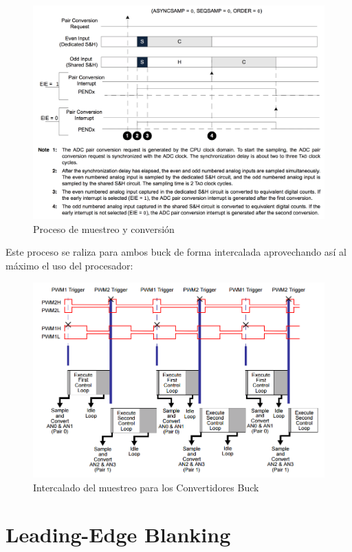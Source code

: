 \documentclass[12pt]{report}
\begin{document}
\begin{figure}[H]
	\centering
	\includegraphics[width=\textwidth,height=\textheight,keepaspectratio]{adc_conversion}
	\caption{Proceso de muestreo y conversión}
\end{figure}

Este proceso se raliza para ambos buck de forma intercalada aprovechando así al máximo el uso del procesador:

\begin{figure}[H]
	\centering
	\includegraphics[width=\textwidth,height=\textheight,keepaspectratio]{cpu-load}
	\caption{Intercalado del muestreo para los Convertidores Buck}
\end{figure}


\section{Leading-Edge Blanking}
\end{document}
